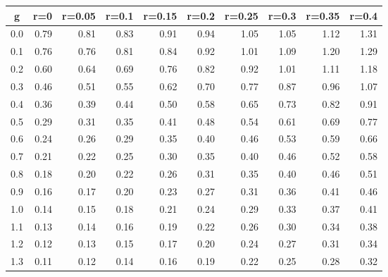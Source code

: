 %
\begin{table}[!tbp]
 \begin{center}
 \begin{tabular}{rrrrrrrrrr}\hline\hline
\multicolumn{1}{c}{g}&\multicolumn{1}{c}{r=0}&\multicolumn{1}{c}{r=0.05}&\multicolumn{1}{c}{r=0.1}&\multicolumn{1}{c}{r=0.15}&\multicolumn{1}{c}{r=0.2}&\multicolumn{1}{c}{r=0.25}&\multicolumn{1}{c}{r=0.3}&\multicolumn{1}{c}{r=0.35}&\multicolumn{1}{c}{r=0.4}\tabularnewline
\hline
0.0&0.79&0.81&0.83&0.91&0.94&1.05&1.05&1.12&1.31\tabularnewline
0.1&0.76&0.76&0.81&0.84&0.92&1.01&1.09&1.20&1.29\tabularnewline
0.2&0.60&0.64&0.69&0.76&0.82&0.92&1.01&1.11&1.18\tabularnewline
0.3&0.46&0.51&0.55&0.62&0.70&0.77&0.87&0.96&1.07\tabularnewline
0.4&0.36&0.39&0.44&0.50&0.58&0.65&0.73&0.82&0.91\tabularnewline
0.5&0.29&0.31&0.35&0.41&0.48&0.54&0.61&0.69&0.77\tabularnewline
0.6&0.24&0.26&0.29&0.35&0.40&0.46&0.53&0.59&0.66\tabularnewline
0.7&0.21&0.22&0.25&0.30&0.35&0.40&0.46&0.52&0.58\tabularnewline
0.8&0.18&0.20&0.22&0.26&0.31&0.35&0.40&0.46&0.51\tabularnewline
0.9&0.16&0.17&0.20&0.23&0.27&0.31&0.36&0.41&0.46\tabularnewline
1.0&0.14&0.15&0.18&0.21&0.24&0.29&0.33&0.37&0.41\tabularnewline
1.1&0.13&0.14&0.16&0.19&0.22&0.26&0.30&0.34&0.38\tabularnewline
1.2&0.12&0.13&0.15&0.17&0.20&0.24&0.27&0.31&0.34\tabularnewline
1.3&0.11&0.12&0.14&0.16&0.19&0.22&0.25&0.28&0.32\tabularnewline
\hline
\end{tabular}

\end{center}

\end{table}

